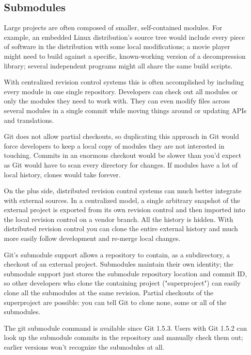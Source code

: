 \subsection{Submodules}
Large projects are often composed of smaller, self-contained modules. For
example, an embedded Linux distribution's source tree would include every piece
of software in the distribution with some local modifications; a movie player
might need to build against a specific, known-working version of a
decompression library; several independent programs might all share the same
build scripts.

With centralized revision control systems this is often accomplished by
including every module in one single repository. Developers can check out all
modules or only the modules they need to work with. They can even modify files
across several modules in a single commit while moving things around or
updating APIs and translations.

Git does not allow partial checkouts, so duplicating this approach in Git would
force developers to keep a local copy of modules they are not interested in
touching. Commits in an enormous checkout would be slower than you'd expect as
Git would have to scan every directory for changes. If modules have a lot of
local history, clones would take forever.

On the plus side, distributed revision control systems can much better
integrate with external sources. In a centralized model, a single arbitrary
snapshot of the external project is exported from its own revision control and
then imported into the local revision control on a vendor branch. All the
history is hidden. With distributed revision control you can clone the entire
external history and much more easily follow development and re-merge local
changes.

Git's submodule support allows a repository to contain, as a subdirectory, a
checkout of an external project. Submodules maintain their own identity; the
submodule support just stores the submodule repository location and commit ID,
so other developers who clone the containing project ("superproject") can
easily clone all the submodules at the same revision. Partial checkouts of the
superproject are possible: you can tell Git to clone none, some or all of the
submodules.

The git submodule command is available since Git 1.5.3. Users with Git 1.5.2
can look up the submodule commits in the repository and manually check them
out; earlier versions won't recognize the submodules at all.

